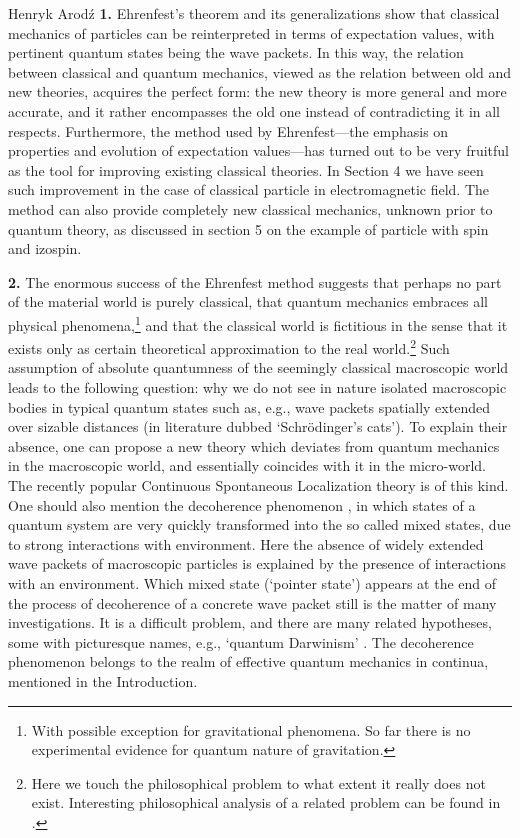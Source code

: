 \begin{artengenv}{Henryk Arod\'z}
{\bf 1.} Ehrenfest's theorem and its generalizations show that classical mechanics of particles can be reinterpreted in terms of expectation values, with pertinent quantum states being the wave packets. In this way, the relation between classical and quantum mechanics, viewed as the relation between old and new theories, acquires the perfect form: the new theory is more general and more accurate, and it rather encompasses the old one instead of contradicting it in all respects. Furthermore, the method used by Ehrenfest---the emphasis on properties and evolution of expectation values---has turned out to be very fruitful as the tool for improving existing classical theories. In Section 4 we have seen such improvement in the case of classical particle in electromagnetic field. The method can also provide completely new classical mechanics, unknown prior to quantum theory, as discussed in section 5 on the example of particle with spin and izospin. 




{\bf 2.} The enormous success of the Ehrenfest method suggests that perhaps no part of the material world is purely classical, that quantum mechanics embraces all physical phenomena,\footnote{With possible exception for gravitational phenomena. So far there is no experimental evidence for quantum nature of gravitation.} and that the classical world is fictitious in the sense that it exists only as certain theoretical approximation to the real world.\footnote{Here we touch the philosophical problem to what extent it really does not exist. Interesting philosophical analysis of a related problem can be found in \parencite{heller}.}
 Such assumption of absolute quantumness of the seemingly classical macroscopic world leads to the following question: why we do not see in nature isolated macroscopic bodies in typical quantum states such as, e.g., wave packets spatially extended over sizable distances (in literature dubbed `Schr\"odinger's cats'). To explain their absence, one can propose a new theory which deviates from quantum mechanics in the macroscopic world, and essentially coincides with it in the micro-world. The recently popular Continuous Spontaneous Localization theory \parencite{CSL} is of this kind. 
 One should also mention 
the decoherence phenomenon \parencite{zeh,zurek}, in which states of a quantum system are very quickly transformed into the so called mixed states, due to strong interactions with environment. Here the absence of widely extended wave packets of macroscopic particles is explained by the presence of interactions with an environment. Which mixed state (`pointer state') appears at the end of the process of decoherence of a concrete wave packet still is the matter of many investigations. It is a difficult problem, and there are many related hypotheses, some with picturesque names, e.g., `quantum Darwinism' \parencite{zurek2}. The decoherence phenomenon belongs to the realm of effective quantum mechanics in continua, mentioned in the Introduction. 



\end{artengenv}
